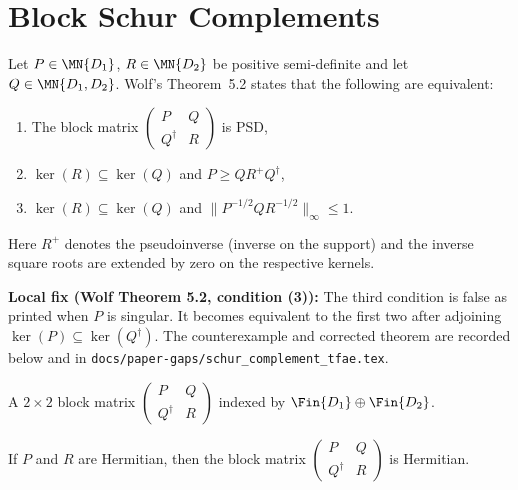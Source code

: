 \section{Block Schur Complements}\label{sec:schur_complement}

\begin{theorem}\label{thm:schur_tfae}
  \notready
  Let $P \in \MN{D_1}$, $R \in \MN{D_2}$ be positive semi-definite
  and let $Q \in \MN{D_1,D_2}$. Wolf's Theorem~5.2 states that the
  following are equivalent:
  \begin{enumerate}
    \item The block matrix $\begin{pmatrix} P & Q \\ Q^\dagger & R \end{pmatrix}$ is PSD,
    \item $\ker(R) \subseteq \ker(Q)$ and
      $P \ge Q R^+ Q^\dagger$,
    \item $\ker(R) \subseteq \ker(Q)$ and
      $\|P^{-1/2}Q R^{-1/2}\|_\infty \le 1$.
  \end{enumerate}
  Here $R^+$ denotes the pseudoinverse (inverse on the support) and the
  inverse square roots are extended by zero on the respective kernels.

  \textbf{Local fix (Wolf Theorem 5.2, condition (3)):}
  The third condition is false as printed when $P$ is singular. It becomes
  equivalent to the first two after adjoining
  $\ker(P)\subseteq\ker(Q^\dagger)$. The counterexample and corrected theorem
  are recorded below and in
  \texttt{docs/paper-gaps/schur\_complement\_tfae.tex}.
\end{theorem}

\begin{definition}\label{def:blockMatrix}
  \leanok
  A $2 \times 2$ block matrix $\begin{pmatrix} P & Q \\ Q^\dagger & R \end{pmatrix}$
  indexed by $\Fin{D_1} \oplus \Fin{D_2}$.
\end{definition}

\begin{lemma}\label{lem:blockMatrix_isHermitian}
  \leanok
  If $P$ and $R$ are Hermitian, then the block matrix
  $\begin{pmatrix} P & Q \\ Q^\dagger & R \end{pmatrix}$ is Hermitian.
\end{lemma}

